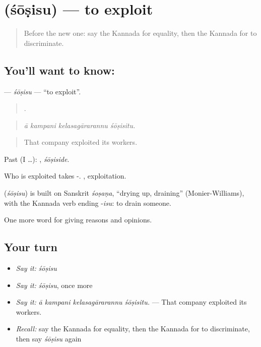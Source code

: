 \section[\texorpdfstring{\kn{ಶೋಷಿಸು} (śōṣisu)}{ಶೋಷಿಸು (śōṣisu)}]{ (śōṣisu) — to exploit}

\label{lesson:KA-C391-sosisu}



\begin{quote}
Before the new one: say the Kannada for equality, then the Kannada for to discriminate.
\end{quote}

\subsection*{You'll want to know: }
\textbf{} — \emph{śōṣisu} — \textquotedblleft{}to exploit\textquotedblright{}.

\begin{quote}
   .
\end{quote}

\begin{quote}
\emph{ā kampani kelasagārarannu śōṣisitu.}
\end{quote}

\begin{quote}
That company exploited its workers.
\end{quote}

Past (I …): , \emph{śōṣiside}.

Who is exploited takes -. , exploitation.

\begin{cousinweb}
\textbf{} (\emph{śōṣisu}) is built on Sanskrit \emph{śoṣaṇa}, \textquotedblleft{}drying up, draining\textquotedblright{} (Monier-Williams), with the Kannada verb ending -\emph{isu}: to drain someone.
\end{cousinweb}

\begin{grammarlens}[title={What you've built}]
One more word for giving reasons and opinions.
\end{grammarlens}

\subsection*{Your turn}
\begin{itemize}
\raggedright
  \item \emph{Say it:} \emph{śōṣisu}
  \item \emph{Say it:} \emph{śōṣisu}, once more
  \item \emph{Say it:} \emph{ā kampani kelasagārarannu śōṣisitu.} — That company exploited its workers.
  \item \emph{Recall:} say the Kannada for equality, then the Kannada for to discriminate, then say \emph{śōṣisu} again
\end{itemize}

